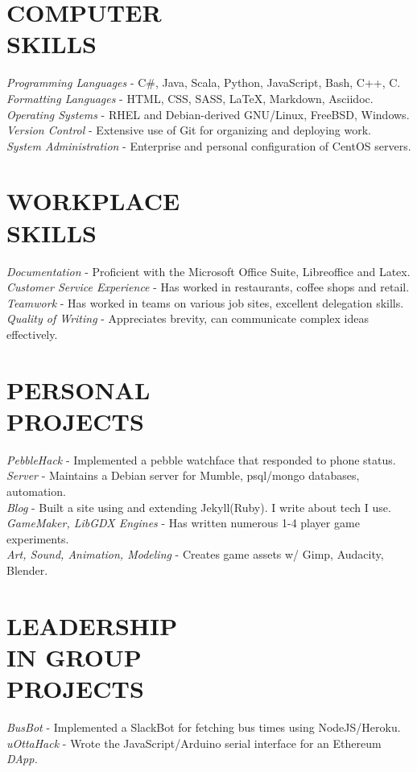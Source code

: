 \documentclass[margin]{res}
\begin{document}
\begin{resume}
\section{COMPUTER \\ SKILLS} 
{\sl Programming Languages} - C\#, Java, Scala, Python, JavaScript, Bash, C++, C.\\
{\sl Formatting Languages} - HTML, CSS, SASS, LaTeX, Markdown, Asciidoc.\\
{\sl Operating Systems} - RHEL and Debian-derived GNU/Linux, FreeBSD, Windows. \\
{\sl Version Control} - Extensive use of Git for organizing and deploying work. \\
{\sl System Administration } - Enterprise and personal configuration of CentOS servers.
                 
\section{WORKPLACE \\ SKILLS} 
 {\sl Documentation} - Proficient with the Microsoft Office Suite, Libreoffice and Latex.\\
{\sl Customer Service Experience} - Has worked in restaurants, coffee shops and retail.\\
{\sl Teamwork} - Has worked in teams on various job sites, excellent delegation skills.\\
{\sl Quality of Writing} - Appreciates brevity, can communicate complex ideas effectively.\\



\section{PERSONAL \\ PROJECTS}
{\sl PebbleHack} - Implemented a pebble watchface that responded to phone status.\\
{\sl Server} - Maintains a Debian server for Mumble, psql/mongo databases, automation.\\   
{\sl Blog} - Built a site using and extending Jekyll(Ruby). I write about tech I use.\\  
{\sl GameMaker, LibGDX Engines} - Has written numerous 1-4 player game experiments.\\
{\sl Art, Sound, Animation, Modeling} - Creates game assets w/ Gimp, Audacity, Blender.\\

\section{LEADERSHIP \\ IN GROUP \\ PROJECTS}
{\sl BusBot} - Implemented a SlackBot for fetching bus times using NodeJS/Heroku.\\
{\sl uOttaHack} - Wrote the JavaScript/Arduino serial interface for an Ethereum {\sl DApp.}\\


\end{resume}
\end{document}
